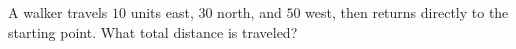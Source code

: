 A walker travels $10$ units east, $30$ north, and $50$ west, then returns directly to the starting point. What total distance is traveled?
